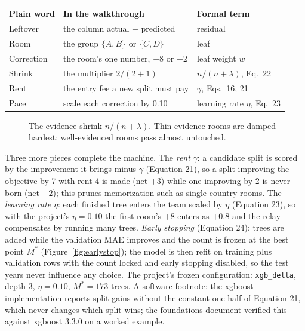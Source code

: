 \documentclass[11pt]{article}
\begin{document}
\begin{center}
\begin{tabular}{lll}
\toprule
Plain word & In the walkthrough & Formal term \\
\midrule
Leftover & the column actual $-$ predicted & residual \\
Room & the group $\{A, B\}$ or $\{C, D\}$ & leaf \\
Correction & the room's one number, $+8$ or $-2$ & leaf weight $w$ \\
Shrink & the multiplier $2/(2+1)$ & $n/(n+\lambda)$, Eq.~22 \\
Rent & the entry fee a new split must pay & $\gamma$, Eqs.~16, 21 \\
Pace & scale each correction by 0.10 & learning rate $\eta$, Eq.~23 \\
\bottomrule
\end{tabular}
\end{center}

\begin{figure}[ht]
\centering
{}
\caption{The evidence shrink $n/(n+\lambda)$. Thin-evidence rooms are
damped hardest; well-evidenced rooms pass almost untouched.}
\label{fig:shrink}
\end{figure}

Three more pieces complete the machine. The \emph{rent} $\gamma$: a
candidate split is scored by the improvement it brings minus $\gamma$
(Equation 21), so a split improving the objective by 7 with rent 4 is
made (net $+3$) while one improving by 2 is never born (net $-2$); this
prunes memorization such as single-country rooms. The \emph{learning
rate} $\eta$: each finished tree enters the team scaled by $\eta$
(Equation 23), so with the project's $\eta = 0.10$ the first room's $+8$
enters as $+0.8$ and the relay compensates by running many trees.
\emph{Early stopping} (Equation 24): trees are added while the validation
MAE improves and the count is frozen at the best point $M^*$
(Figure~\ref{fig:earlystop}); the model is then refit on training plus
validation rows with the count locked and early stopping disabled, so the
test years never influence any choice. The project's frozen
configuration: \texttt{xgb\_delta}, depth 3, $\eta = 0.10$, $M^* = 173$
trees. A software footnote: the xgboost implementation reports split
gains without the constant one half of Equation 21, which never changes
which split wins; the foundations document verified this against xgboost
3.3.0 on a worked example.
\end{document}
